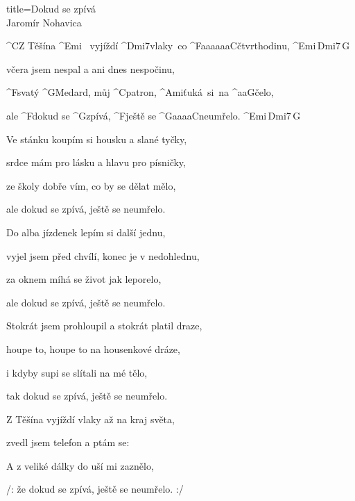 \begin{song}{title=\predtitle\centering Dokud se zpívá \\\large Jaromír Nohavica  \vspace*{-0.3cm}}  %
\begin{centerjustified}
\nejnejvetsi

\sloka
	^{C}Z Těšína ^{Emi\,\,\,\,\,}vyjíždí ^{Dmi7\z}vlaky~co ^{F{\color{white}aaaaaa}C}čtvrthodinu, ^{Emi\,Dmi7\,G}

	včera jsem nespal a ani dnes nespočinu,

	^{F}svatý ^{G}Medard, můj ^{C}patron, ^{\z Ami\:\:\:}ťuká~si~na ^{{\color{white}aa}G}čelo,

	ale ^{F}dokud se ^{G}zpívá, ^{F}ještě se ^{G{\color{white}aaaa}C}neumřelo. ^{Emi\,Dmi7\,G}

\sloka
	Ve stánku koupím si housku a slané tyčky,

	srdce mám pro lásku a hlavu pro písničky,

	ze školy dobře vím, co by se dělat mělo,

	ale dokud se zpívá, ještě se neumřelo.

\sloka
	Do alba jízdenek lepím si další jednu,

	vyjel jsem před chvílí, konec je v nedohlednu,

	za oknem míhá se život jak leporelo,

	ale dokud se zpívá, ještě se neumřelo.

\sloka
	Stokrát jsem prohloupil a stokrát platil draze,

	houpe to, houpe to na housenkové dráze,

	i kdyby supi se slítali na mé tělo,

	tak dokud se zpívá, ještě se neumřelo.

\sloka
	Z Těšína vyjíždí vlaky až na kraj světa,

	zvedl jsem telefon a ptám se: 

	A z veliké dálky do uší mi zaznělo,

	/: že dokud se zpívá, ještě se neumřelo. :/


\end{centerjustified}


\end{song}
